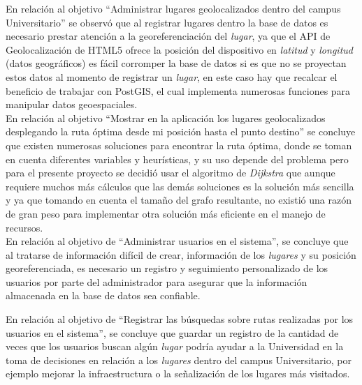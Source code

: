 
En relación al objetivo ``Administrar lugares geolocalizados dentro del campus Universitario'' se observó que al registrar lugares dentro la base de datos es necesario prestar atención a la georeferenciación del \emph{lugar}, ya que el API de Geolocalización de HTML5 ofrece la posición del dispositivo en \emph{latitud} y \emph{longitud} (datos geográficos) es fácil corromper la base de datos si es que no se proyectan estos datos al momento de registrar un \emph{lugar}, en este caso hay que recalcar el beneficio de trabajar con  PostGIS, el cual implementa numerosas funciones para manipular datos geoespaciales. \\

 En relación al objetivo ``Mostrar en la aplicación los lugares geolocalizados desplegando la ruta óptima desde mi posición hasta el punto destino'' se concluye que existen numerosas soluciones para encontrar la ruta óptima, donde se toman en cuenta diferentes variables y heurísticas, y su uso depende del problema pero para el presente proyecto se decidió usar el algoritmo de \emph{Dijkstra} que aunque requiere muchos más cálculos que las demás soluciones es la solución más sencilla y ya que tomando en cuenta el tamaño del grafo resultante, no existió una razón de gran peso para implementar otra solución más eficiente en el manejo de recursos.\\


 En relación al objetivo de ``Administrar usuarios en el sistema'', se concluye que al tratarse de información difícil de crear, información de los \emph{lugares} y su posición georeferenciada, es necesario un registro y seguimiento personalizado de los usuarios por parte del administrador para asegurar que la información almacenada en la base de datos sea confiable.


En relación al objetivo de ``Registrar las búsquedas sobre rutas realizadas por los usuarios en el sistema'', se concluye que guardar un registro de la cantidad de veces que los usuarios buscan algún \emph{lugar} podría ayudar a la Universidad en la toma de decisiones en relación a los \emph{lugares} dentro del campus Universitario, por ejemplo mejorar la infraestructura o la señalización de los lugares más visitados.


